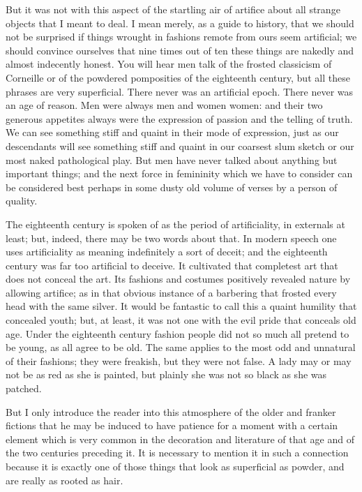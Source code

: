 \documentclass[final,10pt,letterpaper,twocolumn,openany]{book}
\begin{document}
But it was not with this aspect of the startling air of artifice about all
strange objects that I meant to deal. I mean merely, as a guide to history,
that we should not be surprised if things wrought in fashions remote from
ours seem artificial; we should convince ourselves that nine times out of
ten these things are nakedly and almost indecently honest. You will hear
men talk of the frosted classicism of Corneille or of the powdered
pomposities of the eighteenth century, but all these phrases are very
superficial. There never was an artificial epoch. There never was an age of
reason. Men were always men and women women: and their two generous
appetites always were the expression of passion and the telling of truth.
We can see something stiff and quaint in their mode of expression, just as
our descendants will see something stiff and quaint in our coarsest slum
sketch or our most naked pathological play. But men have never talked
about anything but important things; and the next force in femininity
which we have to consider can be considered best perhaps in some dusty
old volume of verses by a person of quality.

The eighteenth century is spoken of as the period of artificiality, in
externals at least; but, indeed, there may be two words about that. In
modern speech one uses artificiality as meaning indefinitely a sort of
deceit; and the eighteenth century was far too artificial to deceive. It
cultivated that completest art that does not conceal the art. Its fashions and
costumes positively revealed nature by allowing artifice; as in that obvious
instance of a barbering that frosted every head with the same silver. It
would be fantastic to call this a quaint humility that concealed youth; but,
at least, it was not one with the evil pride that conceals old age. Under the
eighteenth century fashion people did not so much all pretend to be young,
as all agree to be old. The same applies to the most odd and unnatural of
their fashions; they were freakish, but they were not false. A lady may or
may not be as red as she is painted, but plainly she was not so black as she
was patched.

But I only introduce the reader into this atmosphere of the older and
franker fictions that he may be induced to have patience for a moment
with a certain element which is very common in the decoration and
literature of that age and of the two centuries preceding it. It is necessary
to mention it in such a connection because it is exactly one of those things
that look as superficial as powder, and are really as rooted as hair.
\end{document}

